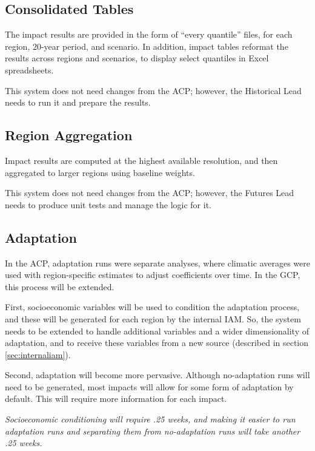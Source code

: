 \documentclass[12pt, oneside]{amsart}
\begin{document}
\subsection{Consolidated Tables}
\label{sec:tables}

The impact results are provided in the form of ``every quantile''
files, for each region, 20-year period, and scenario.  In addition,
impact tables reformat the results across regions and scenarios, to
display select quantiles in Excel spreadsheets.

This system does not need changes from the ACP; however, the
Historical Lead needs to run it and prepare the results.

\subsection{Region Aggregation}
\label{sec:aggregation}

Impact results are computed at the highest available resolution, and
then aggregated to larger regions using baseline weights.

This system does not need changes from the ACP; however, the Futures
Lead needs to produce unit tests and manage the logic for it.

\subsection{Adaptation}
\label{sec:adaptation}

In the ACP, adaptation runs were separate analyses, where climatic
averages were used with region-specific estimates to adjust
coefficients over time.  In the GCP, this process will be extended.

First, socioeconomic variables will be used to condition the
adaptation process, and these will be generated for each region by the
internal IAM.  So, the system needs to be extended to handle
additional variables and a wider dimensionality of adaptation, and to
receive these variables from a new source (described in section
\ref{sec:internaliam}).

Second, adaptation will become more pervasive.  Although no-adaptation
runs will need to be generated, most impacts will allow for some form
of adaptation by default.  This will require more information for each
impact.

{\it Socioeconomic conditioning will require .25 weeks, and making it easier to run adaptation runs and separating them from no-adaptation runs will take another .25 weeks.}
\end{document}
